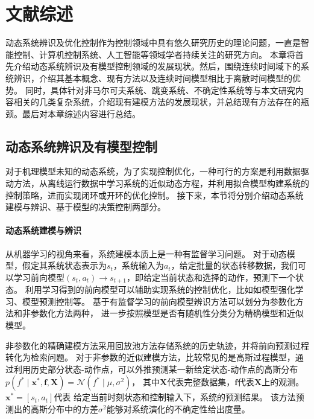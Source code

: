 \chapter{文献综述}
动态系统辨识及优化控制作为控制领域中具有悠久研究历史的理论问题，一直是智能控制、计算机控制系统、人工智能等领域学者持续关注的研究方向。
本章将首先介绍动态系统辨识及有模型控制领域的发展现状。然后，围绕连续时间域下的系统辨识，介绍其基本概念、现有方法以及连续时间模型相比于离散时间模型的优势。
同时，具体针对非马尔可夫系统、跳变系统、不确定性系统等与本文研究内容相关的几类复杂系统，介绍现有建模方法的发展现状，并总结现有方法存在的瓶颈。最后对本章综述内容进行总结。
\section{动态系统辨识及有模型控制}
\label{sec:2_1}
对于机理模型未知的动态系统，为了实现控制优化，一种可行的方案是利用数据驱动方法，从离线运行数据中学习系统的近似动态方程，并利用拟合模型构建系统的控制策略，进而实现闭环或开环的优化控制。
接下来，本节将分别介绍动态系统建模与辨识、基于模型的决策控制两部分。
\subsubsection{动态系统建模与辨识}
从机器学习的视角来看，系统建模本质上是一种有监督学习问题\cite{jordan1992forward}。
对于动态模型，假定其系统状态表示为$s_t$，系统输入为$a_t$，给定批量的状态转移数据，我们可以学习前向模型$\left(s_t, a_t\right) \rightarrow s_{t+1}$，即给定当前状态和选择的动作，预测下一个状态。
利用学习得到的前向模型可以辅助实现系统的控制优化，比如如模型强化学习、模型预测控制等\cite{moerland2020model}。
基于有监督学习的前向模型辨识方法可以划分为参数化方法和非参数化方法两种，
进一步按照模型是否有随机性分类分为精确模型和近似模型。

非参数化的精确建模方法采用回放池\cite{lin1992memory}方法存储系统的历史轨迹，并将前向预测过程转化为检索问题。
对于非参数的近似建模方法，比较常见的是高斯过程模型\cite{deisenroth2011pilco,deisenroth2011pilco}，通过利用历史部分状态-动作点，可以外推预测某一新给定状态-动作点的高斯分布$p\left(f^* \mid \boldsymbol{x}^*, \boldsymbol{f}, \boldsymbol{X}\right)=\mathcal{N}\left(f^* \mid \mu, \sigma^2\right)$，
其中$\boldsymbol{X}$代表完整数据集，$\boldsymbol{f}$代表$\boldsymbol{X}$上的观测。$\boldsymbol{x}^*=[s_t,a_t]$代表
给定当前时刻状态和控制输入下，系统的预测结果。
该方法预测出的高斯分布中的方差$\sigma^2$能够对系统演化的不确定性给出度量。

